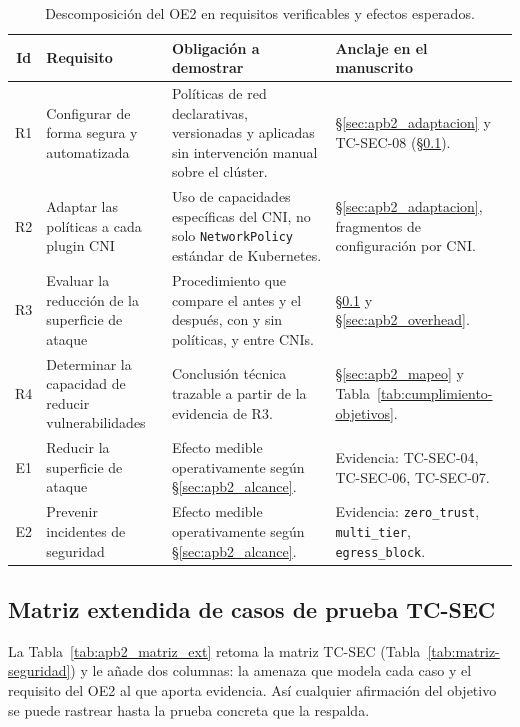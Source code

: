 \begin{table}[htbp]
\centering
\scriptsize
\caption{Descomposición del OE2 en requisitos verificables y efectos esperados.}
\label{tab:apb2_verbos}
\begin{tabularx}{\textwidth}{|c|l|Y|Y|}
\hline
\textbf{Id} & \textbf{Requisito} & \textbf{Obligación a demostrar} & \textbf{Anclaje en el manuscrito} \\
\hline
R1 & Configurar de forma segura y automatizada & Políticas de red declarativas, versionadas y aplicadas sin intervención manual sobre el clúster. & \S\ref{sec:apb2_adaptacion} y TC-SEC-08 (\S\ref{sec:apb2_matriz}). \\
\hline
R2 & Adaptar las políticas a cada plugin CNI & Uso de capacidades específicas del CNI, no solo \texttt{NetworkPolicy} estándar de Kubernetes. & \S\ref{sec:apb2_adaptacion}, fragmentos de configuración por CNI. \\
\hline
R3 & Evaluar la reducción de la superficie de ataque & Procedimiento que compare el antes y el después, con y sin políticas, y entre CNIs. & \S\ref{sec:apb2_matriz} y \S\ref{sec:apb2_overhead}. \\
\hline
R4 & Determinar la capacidad de reducir vulnerabilidades & Conclusión técnica trazable a partir de la evidencia de R3. & \S\ref{sec:apb2_mapeo} y Tabla~\ref{tab:cumplimiento-objetivos}. \\
\hline
E1 & Reducir la superficie de ataque & Efecto medible operativamente según \S\ref{sec:apb2_alcance}. & Evidencia: TC-SEC-04, TC-SEC-06, TC-SEC-07. \\
\hline
E2 & Prevenir incidentes de seguridad & Efecto medible operativamente según \S\ref{sec:apb2_alcance}. & Evidencia: \texttt{zero\_trust}, \texttt{multi\_tier}, \texttt{egress\_block}. \\
\hline
\end{tabularx}
\end{table}

\subsection{Matriz extendida de casos de prueba TC-SEC} \label{sec:apb2_matriz}

La Tabla~\ref{tab:apb2_matriz_ext} retoma la matriz TC-SEC (Tabla~\ref{tab:matriz-seguridad}) y le añade dos columnas: la amenaza que modela cada caso y el requisito del OE2 al que aporta evidencia. Así cualquier afirmación del objetivo se puede rastrear hasta la prueba concreta que la respalda.

